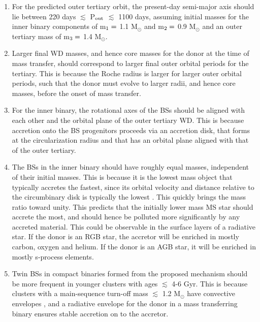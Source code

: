 \documentclass{aastex62}
\begin{document}
\begin{enumerate}

\item For the predicted outer tertiary orbit, the present-day semi-major axis should lie between 220 days $\lesssim$ P$_{\rm out}$ $\lesssim$ 1100 days, assuming initial masses for the inner binary components of m$_{\rm 1} =$ 1.1 M$_{\odot}$ and m$_{\rm 2} =$ 0.9 M$_{\odot}$ and an outer tertiary mass of m$_{\rm 3} =$ 1.4 M$_{\odot}$.

\item Larger final WD masses, and hence core masses for the donor at the time of mass transfer, should correspond to larger final outer orbital periods for the tertiary.  This is because the Roche radius is larger for larger outer orbital periods, such that the donor must evolve to larger radii, and hence core masses, before the onset of mass transfer.

\item For the inner binary, the rotational axes of the BSs should be aligned with each other and the orbital plane of the outer tertiary WD.  This is because accretion onto the BS progenitors proceeds via an accretion disk, that forms at the circularization radius and that has an orbital plane aligned with that of the outer tertiary.

\item The BSs in the inner binary should have roughly equal masses, independent of their initial masses.  This is because it is the lowest mass object that typically accretes the fastest, since its orbital velocity and distance relative to the circumbinary disk is typically the lowest \citep[e.g.][]{haiman09,farris15,rafikov16,kelley17}.  This quickly brings the mass ratio toward unity.  This predicts that the initially lower mass MS star should accrete the most, and should hence be polluted more significantly by any accreted material.  This could be observable in the surface layers of a radiative star.  If the donor is an RGB star, the accretor will be enriched in mostly carbon, oxygen and helium.  If the donor is an AGB star, it will be enriched in mostly s-process elements.

\item Twin BSs in compact binaries formed from the proposed mechanism should be more frequent in younger clusters with ages $\lesssim$ 4-6 Gyr.  This is because clusters with a main-sequence turn-off mass $\lesssim$ 1.2 M$_{\odot}$ have convective envelopes \citep[e.g.][]{iben91,maedoer09}, and a radiative envelope for the donor in a mass transferring binary ensures stable accretion on to the accretor.

\end{enumerate}
\end{document}
